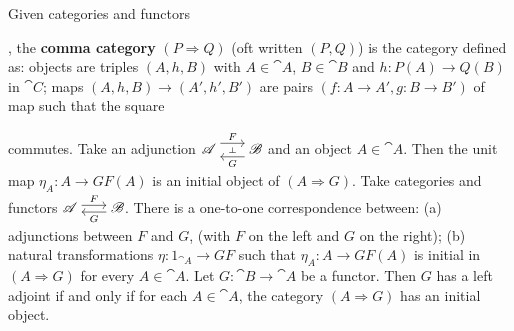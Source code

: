  Given categories and functors 
, the \textbf{comma category} $(P \Rightarrow Q)$ (oft written $(P \comma Q)$) is the category defined as: objects are triples $(A, h, B)$ with $A \in \cat A$, $B \in \cat B$ and $h : P(A) \to Q(B)$ in $\cat C$; maps $(A,h,B) \to (A',h',B')$ are pairs $(f: A \to A', g: B \to B')$ of map such that the square 
 commutes.
 Take an adjunction $\cat{A} \ladj{F}{G} \cat B$  and an object $A \in \cat A$. Then the unit map $\eta_A : A \to GF(A)$ is an initial object of $(A \Rightarrow G)$.
 Take categories and functors $\cat A \isofuncs{F}{G} \cat B$. There is a one-to-one correspondence between: (a) adjunctions between $F$ and $G$, (with $F$ on the left and $G$ on the right); (b) natural transformations $\eta : 1_{\cat{A}} \to GF$ such that $\eta_A : A \to GF(A)$ is initial in $(A \Rightarrow G)$ for every $A \in \cat{A}$.
 Let $G: \cat{B} \to \cat{A}$ be a functor. Then $G$ has a left adjoint if and only if for each $A \in \cat{A}$, the  category $(A \Rightarrow G)$ has an initial object.